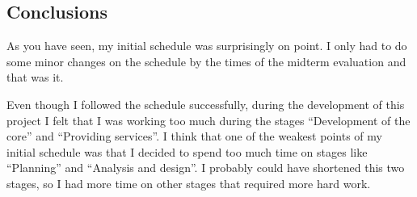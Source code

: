 \subsection{Conclusions}

As you have seen, my initial schedule was surprisingly on point. I only had to
do some minor changes on the schedule by the times of the midterm evaluation
and that was it.

Even though I followed the schedule successfully, during the development of
this project I felt that I was working too much during the stages ``Development
of the core'' and ``Providing services''. I think that one of the weakest
points of my initial schedule was that I decided to spend too much time on
stages like ``Planning'' and ``Analysis and design''. I probably could have
shortened this two stages, so I had more time on other stages that required
more hard work.
